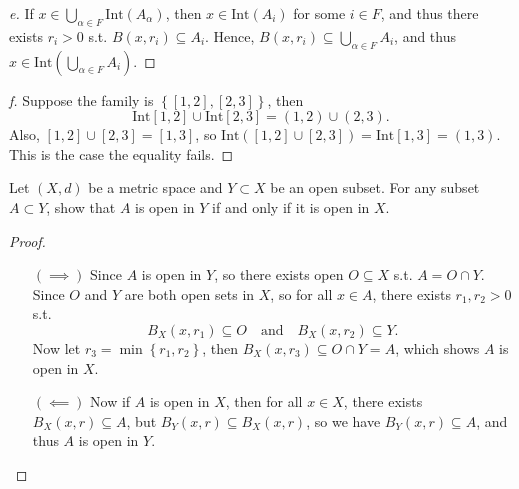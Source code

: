 \begin{proof}[e]
  If \(x \in \bigcup_{\alpha \in F} \mathrm{Int}(A_\alpha )  \), then \(x \in \mathrm{Int}(A_i) \) for some \(i \in F\), and thus there exists \(r_i > 0\) s.t. \(B(x, r_i) \subseteq A_i\). Hence, \(B(x, r_i) \subseteq \bigcup_{\alpha \in F} A_i \), and thus \(x \in \mathrm{Int}\left( \bigcup_{\alpha \in F}A_i  \right)  \).       
\end{proof}
\begin{proof}[f]
  Suppose the family is \(\left\{ [1, 2], [2, 3] \right\} \), then 
  \[
    \mathrm{Int}[1, 2] \cup \mathrm{Int}[2, 3] = (1, 2) \cup (2, 3).  
  \]
  Also, \([1, 2] \cup [2, 3] = [1, 3]\), so \(\mathrm{Int}\left( [1,2] \cup [2, 3] \right) = \mathrm{Int}[1, 3] = (1, 3)   \). This is the case the equality fails. 
\end{proof}

\begin{problem}
    Let $(X, d)$ be a metric space and $Y \subset X$ be an open subset. For any subset $A \subset Y$, show
that $A$ is open in $Y$ if and only if it is open in $X$.
\end{problem}
\begin{proof}
  \vphantom{text}
  \begin{itemize}
    \item [\((\implies )\)] Since \(A\) is open in \(Y\), so there exists open \(O \subseteq X\) s.t. \(A = O \cap Y\). Since \(O\) and \(Y\) are both open sets in \(X\), so for all $x \in A$, there exists \(r_1, r_2 > 0\) s.t. 
    \[
      B_X (x, r_1) \subseteq O \quad \text{and} \quad B_X(x, r_2) \subseteq Y.
    \]
    Now let \(r_3 = \min \left\{ r_1, r_2  \right\} \), then \(B_X(x, r_3) \subseteq O \cap Y = A\), which shows \(A\) is open in \(X\). 
    \item [\((\impliedby )\)]  Now if \(A\) is open in \(X\), then for all \(x \in X\), there exists \(B_X(x, r) \subseteq A\), but \(B_Y (x, r) \subseteq B_X(x, r)\), so we have \(B_Y(x, r) \subseteq A\), and thus \(A\) is open in \(Y\).                     
  \end{itemize}
\end{proof}

